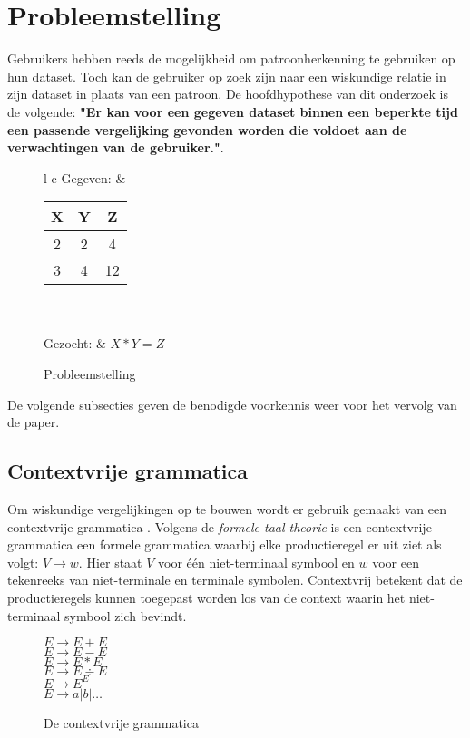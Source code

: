 \documentclass[Main.tex]{subfiles}
\begin{document}
\section{Probleemstelling}
Gebruikers hebben reeds de mogelijkheid om patroonherkenning te gebruiken op hun dataset. Toch kan de gebruiker op zoek zijn naar een wiskundige relatie in zijn dataset in plaats van een patroon. De hoofdhypothese van dit onderzoek is de volgende: \textbf{"Er kan voor een gegeven dataset binnen een beperkte tijd een passende vergelijking gevonden worden die voldoet aan de verwachtingen van de gebruiker."}. 

\begin{figure}[!htb]
\centering
\begin{framed}
\begin{tabular}{l c}
Gegeven: &
\begin{tabular}{| c | c | | c |}
\hline
X & Y & Z \\ \hline
2 & 2 & 4 \\ \hline
3 & 4 &12 \\ \hline
\end{tabular} \\ \\
Gezocht: & $X*Y = Z$
\end{tabular}
\end{framed}
\caption{Probleemstelling}
\label{fig:psvb}
\end{figure}

\par De volgende subsecties geven de benodigde voorkennis weer voor het vervolg van de paper.

\subsection{Contextvrije grammatica}
Om wiskundige vergelijkingen op te bouwen wordt er gebruik gemaakt van een contextvrije grammatica \cite{equationDisc}. Volgens de \textit{formele taal theorie} \cite{cfg} is een contextvrije grammatica een formele grammatica waarbij elke productieregel er uit ziet als volgt: $V \rightarrow w$. Hier staat $V$  voor \'e\'en niet-terminaal symbool en $w$ voor een tekenreeks van niet-terminale en terminale symbolen. Contextvrij betekent dat de productieregels kunnen toegepast worden los van de context waarin het niet-terminaal symbool zich bevindt.

\begin{figure}[!htb]
\centering
\begin{framed}
$E \rightarrow E + E$ \\
$E \rightarrow E - E$ \\
$E \rightarrow E \ast E$ \\
$E \rightarrow E \div E$ \\
$E \rightarrow E^{E}$ \\
$E \rightarrow a | b | \dotsc$
\end{framed}
\caption{De contextvrije grammatica}
\label{fig:cfg}
\end{figure}
\end{document}
